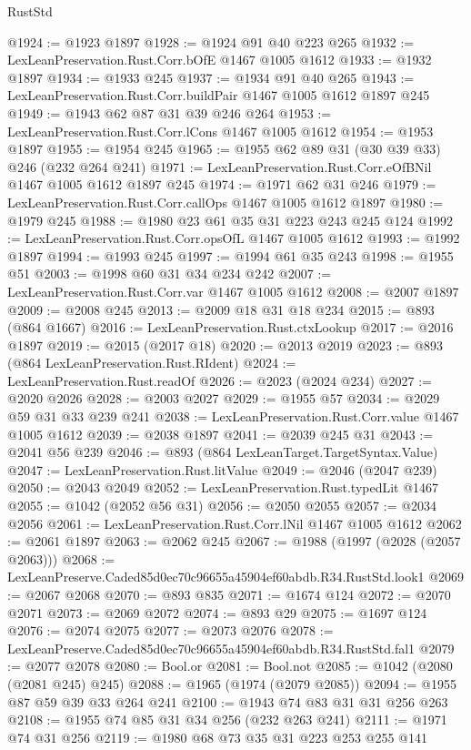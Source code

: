 \begin{lexlean}{RustStd}
\begin{coremodule}
@1924 := @1923 @1897
@1928 := @1924 @91 @40 @223 @265
@1932 := LexLeanPreservation.Rust.Corr.bOfE @1467 @1005 @1612
@1933 := @1932 @1897
@1934 := @1933 @245
@1937 := @1934 @91 @40 @265
@1943 := LexLeanPreservation.Rust.Corr.buildPair @1467 @1005 @1612 @1897 @245
@1949 := @1943 @62 @87 @31 @39 @246 @264
@1953 := LexLeanPreservation.Rust.Corr.lCons @1467 @1005 @1612
@1954 := @1953 @1897
@1955 := @1954 @245
@1965 := @1955 @62 @89 @31 (@30 @39 @33) @246 (@232 @264 @241)
@1971 := LexLeanPreservation.Rust.Corr.eOfBNil @1467 @1005 @1612 @1897 @245
@1974 := @1971 @62 @31 @246
@1979 := LexLeanPreservation.Rust.Corr.callOps @1467 @1005 @1612 @1897
@1980 := @1979 @245
@1988 := @1980 @23 @61 @35 @31 @223 @243 @245 @124
@1992 := LexLeanPreservation.Rust.Corr.opsOfL @1467 @1005 @1612
@1993 := @1992 @1897
@1994 := @1993 @245
@1997 := @1994 @61 @35 @243
@1998 := @1955 @51
@2003 := @1998 @60 @31 @34 @234 @242
@2007 := LexLeanPreservation.Rust.Corr.var @1467 @1005 @1612
@2008 := @2007 @1897
@2009 := @2008 @245
@2013 := @2009 @18 @31 @18 @234
@2015 := @893 (@864 @1667)
@2016 := LexLeanPreservation.Rust.ctxLookup
@2017 := @2016 @1897
@2019 := @2015 (@2017 @18)
@2020 := @2013 @2019
@2023 := @893 (@864 LexLeanPreservation.Rust.RIdent)
@2024 := LexLeanPreservation.Rust.readOf
@2026 := @2023 (@2024 @234)
@2027 := @2020 @2026
@2028 := @2003 @2027
@2029 := @1955 @57
@2034 := @2029 @59 @31 @33 @239 @241
@2038 := LexLeanPreservation.Rust.Corr.value @1467 @1005 @1612
@2039 := @2038 @1897
@2041 := @2039 @245 @31
@2043 := @2041 @56 @239
@2046 := @893 (@864 LexLeanTarget.TargetSyntax.Value)
@2047 := LexLeanPreservation.Rust.litValue
@2049 := @2046 (@2047 @239)
@2050 := @2043 @2049
@2052 := LexLeanPreservation.Rust.typedLit @1467
@2055 := @1042 (@2052 @56 @31)
@2056 := @2050 @2055
@2057 := @2034 @2056
@2061 := LexLeanPreservation.Rust.Corr.lNil @1467 @1005 @1612
@2062 := @2061 @1897
@2063 := @2062 @245
@2067 := @1988 (@1997 (@2028 (@2057 @2063)))
@2068 := LexLeanPreserve.Caded85d0ec70c96655a45904ef60abdb.R34.RustStd.look1
@2069 := @2067 @2068
@2070 := @893 @835
@2071 := @1674 @124
@2072 := @2070 @2071
@2073 := @2069 @2072
@2074 := @893 @29
@2075 := @1697 @124
@2076 := @2074 @2075
@2077 := @2073 @2076
@2078 := LexLeanPreserve.Caded85d0ec70c96655a45904ef60abdb.R34.RustStd.fal1
@2079 := @2077 @2078
@2080 := Bool.or
@2081 := Bool.not
@2085 := @1042 (@2080 (@2081 @245) @245)
@2088 := @1965 (@1974 (@2079 @2085))
@2094 := @1955 @87 @59 @39 @33 @264 @241
@2100 := @1943 @74 @83 @31 @31 @256 @263
@2108 := @1955 @74 @85 @31 @34 @256 (@232 @263 @241)
@2111 := @1971 @74 @31 @256
@2119 := @1980 @68 @73 @35 @31 @223 @253 @255 @141

\end{coremodule}
\end{lexlean}
